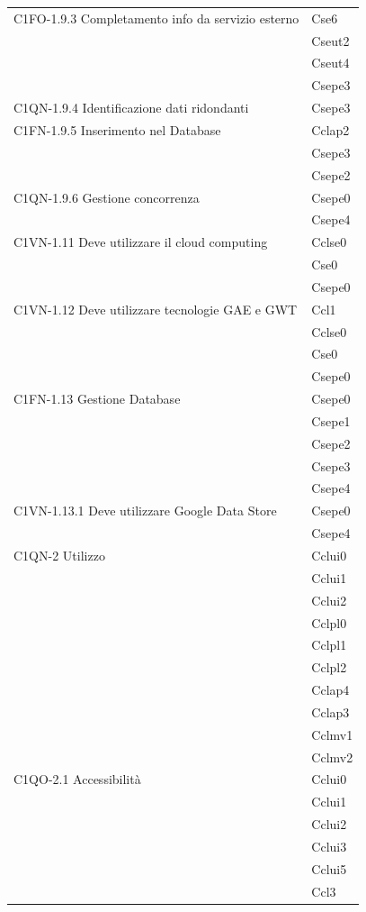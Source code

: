 \begin{footnotesize}
\begin{longtable}[!h]{|l|l|}
C1FO-1.9.3 Completamento info da servizio esterno & Cse6\\
& Cseut2\\
& Cseut4\\
& Csepe3\\\hline  
C1QN-1.9.4 Identificazione dati ridondanti & Csepe3\\\hline                                                                                       
C1FN-1.9.5 Inserimento nel Database & Cclap2\\
& Csepe3\\
& Csepe2\\\hline  
C1QN-1.9.6 Gestione concorrenza & Csepe0\\
& Csepe4\\\hline    
C1VN-1.11 Deve utilizzare il cloud computing & Cclse0\\
& Cse0\\
& Csepe0\\\hline    
C1VN-1.12 Deve utilizzare tecnologie GAE e GWT & Ccl1\\
& Cclse0\\
& Cse0\\
& Csepe0\\\hline                                 
C1FN-1.13 Gestione Database & Csepe0\\
& Csepe1\\
& Csepe2\\
& Csepe3\\
& Csepe4\\\hline   
C1VN-1.13.1 Deve utilizzare Google Data Store & Csepe0\\
& Csepe4\\\hline      
C1QN-2 Utilizzo & Cclui0 \\
& Cclui1\\
& Cclui2\\
& Cclpl0\\
& Cclpl1\\
& Cclpl2\\
& Cclap4\\
& Cclap3\\
& Cclmv1\\
& Cclmv2\\\hline  
C1QO-2.1 Accessibilit\`a & Cclui0\\
& Cclui1\\
& Cclui2\\
& Cclui3\\
& Cclui5\\
& Ccl3\\\hline 

\end{longtable}
\end{footnotesize}
